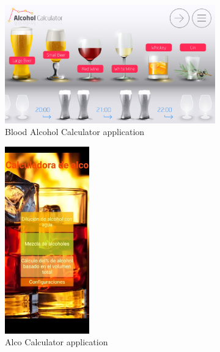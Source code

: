 \begin{figure}[H]
  \begin{subfigure}{0.3\textwidth}
      \centering
      \includegraphics[width=1.1\textwidth]{./img/calculator.png}
      \caption{Blood Alcohol Calculator \cite{calculator} application}
      \label{calculator}
  \end{subfigure}\hfill
  \begin{subfigure}{0.38\textwidth}
      \centering
      \includegraphics[width=0.4\textwidth]{./img/alcocal.png}
      \caption{Alco Calculator \cite{alcocal} application}
      \label{AlcoCalculator}
  \end{subfigure}
  \begin{subfigure}{0.3\textwidth}
      \centering

\end{subfigure}
\end{figure}
